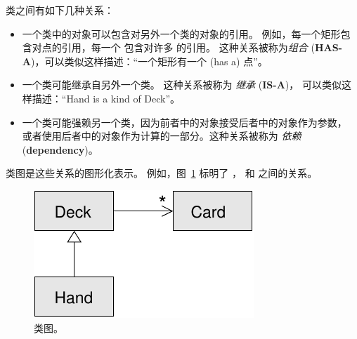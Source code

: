 
类之间有如下几种关系：

\begin{itemize}


\item 一个类中的对象可以包含对另外一个类的对象的引用。  
例如，每一个矩形包含对点的引用，每一个  包含对许多  的引用。 这种关系被称为{\em 组合} ({\bf HAS-A})，可以类似这样描述：``一个矩形有一个 (has a) 点''。


\item 一个类可能继承自另外一个类。  
这种关系被称为 {\em 继承} ({\bf IS-A})， 可以类似这样描述：``Hand is a kind of Deck''。


\item 一个类可能强赖另一个类，因为前者中的对象接受后者中的对象作为参数，
或者使用后者中的对象作为计算的一部分。这种关系被称为 {\em 依赖} ({\bf dependency})。

\end{itemize}



类图是这些关系的图形化表示。  例如，图~\ref{fig.class1} 标明了  ，  和
 之间的关系。

\begin{figure}
\centerline
{\includegraphics[scale=0.8]{../source/figs/class1.pdf}}
\caption{类图。}
\label{fig.class1}
\end{figure}

